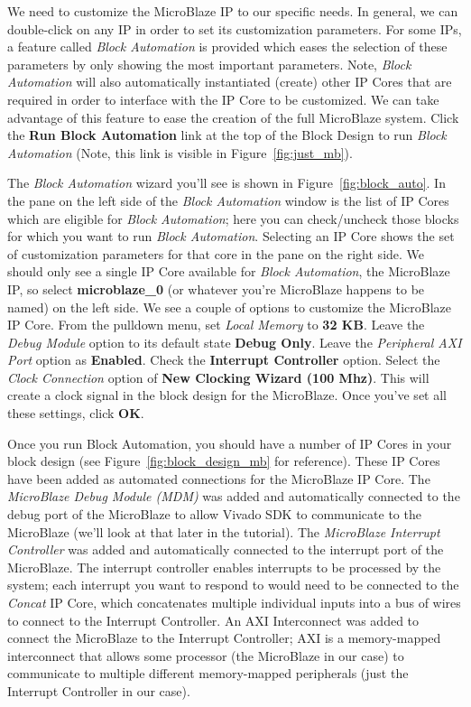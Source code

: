 \documentclass[11pt]{article}
\begin{document}
We need to customize the MicroBlaze IP to our specific needs. In general, we can double-click on any IP in order to set its customization parameters. For some IPs, a feature called \textit{Block Automation} is provided which eases the selection of these parameters by only showing the most important parameters. Note, \textit{Block Automation} will also automatically instantiated (create) other IP Cores that are required in order to interface with the IP Core to be customized. We can take advantage of this feature to ease the creation of the full MicroBlaze system. Click the \textbf{Run Block Automation} link at the top of the Block Design to run \textit{Block Automation} (Note, this link is visible in Figure~\ref{fig:just_mb}).

The \textit{Block Automation} wizard you'll see is shown in Figure~\ref{fig:block_auto}. In the pane on the left side of the \textit{Block Automation} window is the list of IP Cores which are eligible for \textit{Block Automation}; here you can check/uncheck those blocks for which you want to run \textit{Block Automation}. Selecting an IP Core shows the set of customization parameters for that core in the pane on the right side. We should only see a single IP Core available for \textit{Block Automation}, the MicroBlaze IP, so select \textbf{microblaze\_0} (or whatever you're MicroBlaze happens to be named) on the left side. We see a couple of options to customize the MicroBlaze IP Core. From the pulldown menu, set \textit{Local Memory} to \textbf{32 KB}. Leave the \textit{Debug Module} option to its default state \textbf{Debug Only}. Leave the \textit{Peripheral AXI Port} option as \textbf{Enabled}. Check the \textbf{Interrupt Controller} option. Select the \textit{Clock Connection} option of \textbf{New Clocking Wizard (100 Mhz)}. This will create a clock signal in the block design for the MicroBlaze. Once you've set all these settings, click \textbf{OK}.

Once you run Block Automation, you should have a number of IP Cores in your block design (see Figure~\ref{fig:block_design_mb} for reference). These IP Cores have been added as automated connections for the MicroBlaze IP Core. The \textit{MicroBlaze Debug Module (MDM)} was added and automatically connected to the debug port of the MicroBlaze to allow Vivado SDK to communicate to the MicroBlaze (we'll look at that later in the tutorial). The \textit{MicroBlaze Interrupt Controller} was added and automatically connected to the interrupt port of the MicroBlaze. The interrupt controller enables interrupts to be processed by the system; each interrupt you want to respond to would need to be connected to the \textit{Concat} IP Core, which concatenates multiple individual inputs into a bus of wires to connect to the Interrupt Controller. An AXI Interconnect was added to connect the MicroBlaze to the Interrupt Controller; AXI is a memory-mapped interconnect that allows some processor (the MicroBlaze in our case) to communicate to multiple different memory-mapped peripherals (just the Interrupt Controller in our case).
\end{document}
